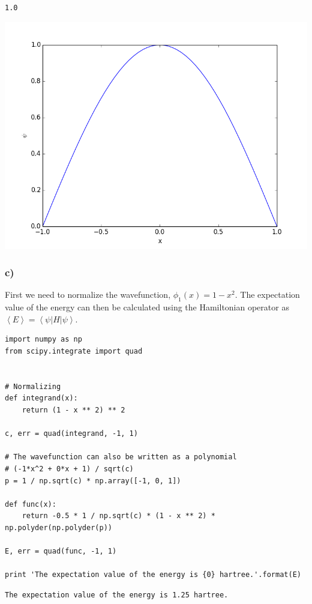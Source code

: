 \documentclass[11pt]{article}
\begin{document}
\begin{verbatim}
1.0
\end{verbatim}

\includegraphics[width=.9\linewidth]{./images/1b.png}

\subsubsection{c)}
\label{sec-1-1-3}

First we need to normalize the wavefunction, $\phi_{1}(x) = 1 - x^{2}$. The expectation value of the energy can then be calculated using the Hamiltonian operator as $\left<E\right> = \left<\psi|H|\psi\right>$.

\begin{verbatim}
import numpy as np
from scipy.integrate import quad


# Normalizing
def integrand(x):
    return (1 - x ** 2) ** 2

c, err = quad(integrand, -1, 1)

# The wavefunction can also be written as a polynomial
# (-1*x^2 + 0*x + 1) / sqrt(c)
p = 1 / np.sqrt(c) * np.array([-1, 0, 1])

def func(x):
    return -0.5 * 1 / np.sqrt(c) * (1 - x ** 2) * np.polyder(np.polyder(p))

E, err = quad(func, -1, 1)

print 'The expectation value of the energy is {0} hartree.'.format(E)
\end{verbatim}

\begin{verbatim}
The expectation value of the energy is 1.25 hartree.
\end{verbatim}
\end{document}

